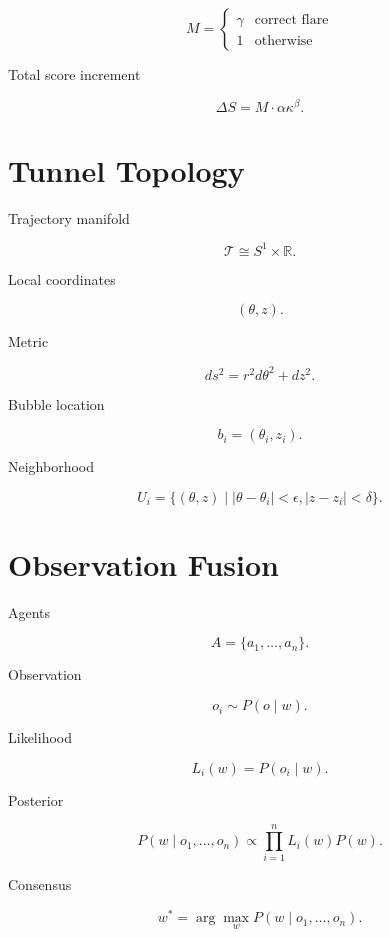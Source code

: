 \documentclass[11pt]{article}
\begin{document}
\[
M =
\begin{cases}
\gamma & \text{correct flare} \\
1 & \text{otherwise}
\end{cases}
\]

Total score increment

\[
\Delta S = M \cdot \alpha \kappa^\beta.
\]


\section{Tunnel Topology}

Trajectory manifold

\[
\mathcal{T} \cong S^1 \times \mathbb{R}.
\]

Local coordinates

\[
(\theta,z).
\]

Metric

\[
ds^2 = r^2 d\theta^2 + dz^2.
\]

Bubble location

\[
b_i = (\theta_i,z_i).
\]

Neighborhood

\[
U_i =
\{(\theta,z) \mid
|\theta-\theta_i| < \epsilon,
|z-z_i| < \delta
\}.
\]


\section{Observation Fusion}

Agents

\[
A = \{a_1,\dots,a_n\}.
\]

Observation

\[
o_i \sim P(o \mid w).
\]

Likelihood

\[
L_i(w) = P(o_i \mid w).
\]

Posterior

\[
P(w \mid o_1,\dots,o_n)
\propto
\prod_{i=1}^n L_i(w)P(w).
\]

Consensus

\[
w^* =
\arg\max_w
P(w \mid o_1,\dots,o_n).
\]
\end{document}

